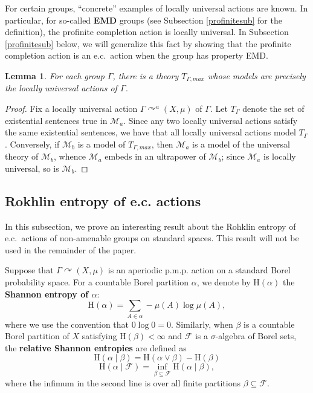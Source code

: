 \documentclass[12pt]{amsart}
\newtheorem{lem}[thm]{Lemma}
\theoremstyle{definition}
\def\cal{\mathcal}
\newcommand{\cF}{\mathcal{F}}
\newcommand{\pmp}{p{$.$}m{$.$}p{$.$}}
\newcommand{\acts}{\curvearrowright}
\newcommand{\sH}{\mathrm{H}}
\newcommand{\given}{\mathbin{|}}
\begin{document}
For certain groups, ``concrete'' examples of locally universal actions are known.  In particular, for so-called \textbf{EMD} groups (see Subsection \ref{profinitesub} for the definition), the profinite completion action is locally universal.  In Subsection \ref{profinitesub} below, we will generalize this fact by showing that the profinite completion action is an e.c.\ action when the group has property EMD.

\begin{lem}
For each group $\Gamma$, there is a theory $T_{\Gamma,max}$ whose models are precisely the locally universal actions of $\Gamma$.
\end{lem}  

\begin{proof}
Fix a locally universal action $\Gamma \curvearrowright^a (X,\mu)$ of $\Gamma$.  Let $T_\Gamma$ denote the set of existential sentences true in $\cal M_a$.  Since any two locally universal actions satisfy the same existential sentences, we have that all locally universal actions model $T_\Gamma$.  Conversely, if $\cal M_b$ is a model of $T_{\Gamma,max}$, then $\cal M_a$ is a model of the universal theory of $\cal M_b$, whence $\cal M_a$ embeds in an ultrapower of $\cal M_b$; since $\cal M_a$ is locally universal, so is $\cal M_b$.
\end{proof}

\subsection{Rokhlin entropy of e.c. actions}

In this subsection, we prove an interesting result about the Rohklin entropy of e.c.\ actions of non-amenable groups on standard spaces.  This result will not be used in the remainder of the paper.

Suppose that $\Gamma \acts (X, \mu)$ is an aperiodic {\pmp} action on a standard Borel probability space. For a countable Borel partition $\alpha$, we denote by $\sH(\alpha)$ the \textbf{Shannon entropy of $\alpha$}:
$$\sH(\alpha) = \sum_{A \in \alpha} - \mu(A) \log \mu(A),$$
 where we use the convention that $0 \log 0 = 0$. Similarly, when $\beta$ is a countable Borel partition of $X$ satisfying $\sH(\beta) < \infty$ and $\cF$ is a $\sigma$-algebra of Borel sets, the \textbf{relative Shannon entropies} are defined as
$$\sH(\alpha \given \beta) = \sH(\alpha \vee \beta) - 
\sH(\beta)$$
$$\sH(\alpha \given \cF) = \inf_{\beta \subseteq \cF} \sH(\alpha \given \beta),$$
where the infimum in the second line is over all finite partitions $\beta \subseteq \cF$. 
\end{document}
